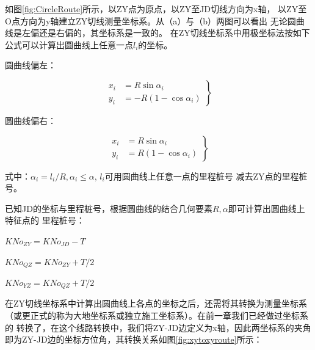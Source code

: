  如图\ref{fig:CircleRoute}所示，以ZY点为原点，以ZY至JD切线方向为x轴，
 以ZY至O点方向为y轴建立ZY切线测量坐标系。从（a）与（b）两图可以看出
无论圆曲线是左偏还是右偏的，其坐标系是一致的。
 在ZY切线坐标系中用极坐标法按如下公式可以计算出圆曲线上任意一点$l_i$的坐标。

圆曲线偏左：

\begin{equation}
\left . 
\begin{aligned}
x_{i} &= R \sin \alpha_i   \\
y_{i} &= -R(1- \cos \alpha_i)
\end{aligned}
\right \}
\end{equation}

圆曲线偏右：

\begin{equation}
\left . 
\begin{aligned}
x_{i} &= R \sin \alpha_i   \\
y_{i} &= R(1- \cos \alpha_i)
\end{aligned} 
\right \}
\end{equation}

式中：$\alpha_i = l_i / R,  \alpha_i \le \alpha $, $l_i$可用圆曲线上任意一点的里程桩号
减去ZY点的里程桩号。

已知JD的坐标与里程桩号，根据圆曲线的结合几何要素$R, \alpha$即可计算出圆曲线上特征点的
里程桩号：

$KNo_{ZY} = KNo_{JD} - T$

$KNo_{QZ} = KNo_{ZY} + T/2$

$KNo_{YZ} = KNo_{QZ} + T/2$

在ZY切线坐标系中计算出圆曲线上各点的坐标之后，还需将其转换为测量坐标系
（或更正式的称为大地坐标系或独立施工坐标系）。在前一章我们已经做过坐标系的
转换了，在这个线路转换中，我们将ZY-JD边定义为x轴，因此两坐标系的夹角
即为ZY-JD边的坐标方位角，其转换关系如图\ref{fig:xytoxyroute}所示：

